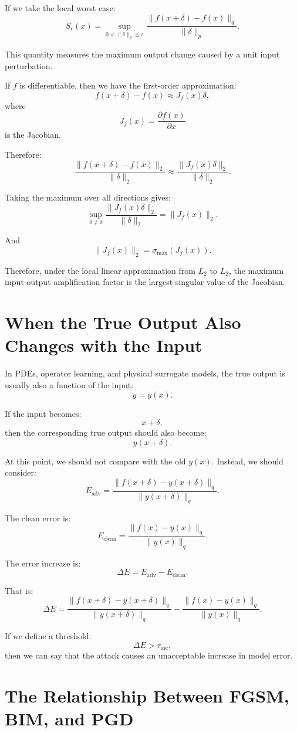\documentclass{article}
\begin{document}
If we take the local worst case:
\[
S_\epsilon(x)
=
\sup_{0<\|\delta\|_p\leq \epsilon}
\frac{
\|f(x+\delta)-f(x)\|_q
}{
\|\delta\|_p
}.
\]

This quantity measures the maximum output change caused by a unit input perturbation.

If \(f\) is differentiable, then we have the first-order approximation:
\[
f(x+\delta)-f(x)
\approx
J_f(x)\delta,
\]
where
\[
J_f(x)=\frac{\partial f(x)}{\partial x}
\]
is the Jacobian.

Therefore:
\[
\frac{
\|f(x+\delta)-f(x)\|_2
}{
\|\delta\|_2
}
\approx
\frac{
\|J_f(x)\delta\|_2
}{
\|\delta\|_2
}.
\]

Taking the maximum over all directions gives:
\[
\sup_{\delta\neq 0}
\frac{
\|J_f(x)\delta\|_2
}{
\|\delta\|_2
}
=
\|J_f(x)\|_2.
\]

And
\[
\|J_f(x)\|_2
=
\sigma_{\max}(J_f(x)).
\]

Therefore, under the local linear approximation from \(L_2\) to \(L_2\), the maximum input-output amplification factor is the largest singular value of the Jacobian.

\section{When the True Output Also Changes with the Input}

In PDEs, operator learning, and physical surrogate models, the true output is usually also a function of the input:
\[
y=y(x).
\]

If the input becomes:
\[
x+\delta,
\]
then the corresponding true output should also become:
\[
y(x+\delta).
\]

At this point, we should not compare with the old \(y(x)\). Instead, we should consider:
\[
E_{\mathrm{adv}}
=
\frac{
\|f(x+\delta)-y(x+\delta)\|_q
}{
\|y(x+\delta)\|_q
}.
\]

The clean error is:
\[
E_{\mathrm{clean}}
=
\frac{
\|f(x)-y(x)\|_q
}{
\|y(x)\|_q
}.
\]

The error increase is:
\[
\Delta E
=
E_{\mathrm{adv}}-E_{\mathrm{clean}}.
\]

That is:
\[
\Delta E
=
\frac{
\|f(x+\delta)-y(x+\delta)\|_q
}{
\|y(x+\delta)\|_q
}
-
\frac{
\|f(x)-y(x)\|_q
}{
\|y(x)\|_q
}.
\]

If we define a threshold:
\[
\Delta E>\tau_{\mathrm{inc}},
\]
then we can say that the attack causes an unacceptable increase in model error.

\section{The Relationship Between FGSM, BIM, and PGD}
\end{document}
